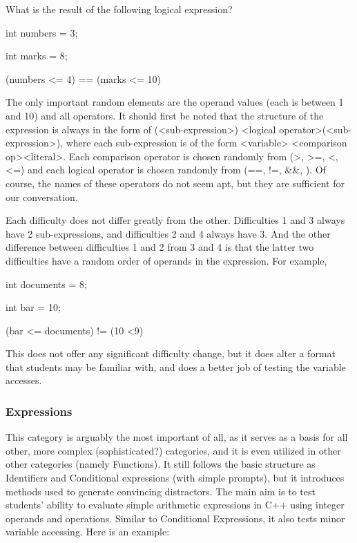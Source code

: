 \documentclass{article}
\begin{document}
\hfill \par
What is the result of the following logical expression? \par
int numbers = 3; \par
int marks = 8; \par
(numbers \textless= 4) == (marks \textless= 10) \par

\hfill \par

The only important random elements are the operand values (each is between 1 and 10) and all operators. It should first be noted that the structure of the expression
is always in the form of (\textless sub-expression\textgreater ) \textless logical operator\textgreater (\textless sub-expression\textgreater ), where each sub-expression is of the form \textless variable> \textless comparison op\textgreater \textless literal\textgreater .
Each comparison operator is chosen randomly from (\textgreater, \textgreater =, \textless , \textless =) and each logical operator is chosen randomly from (==, !=, \&\&, \textbar\textbar). Of course, the names
of these operators do not seem apt, but they are sufficient for our conversation.

Each difficulty does not differ greatly from the other. Difficulties 1 and 3 always have 2 sub-expressions, and difficulties 2 and 4 always have 3. And the other
difference between difficulties 1 and 2 from 3 and 4 is that the latter two difficulties have a random order of operands in the expression. For example,

\hfill \par
int documents = 8; \par
int bar = 10; \par
(bar \textless = documents) != (10 \textless 9) \par
\hfill \par

This does not offer any significant difficulty change, but it does alter a format that students may be familiar with, and does a better job of testing the variable accesses.


\subsubsection{Expressions}
This category is arguably the most important of all, as it serves as a basis for all other, more complex (sophisticated?) categories, and it is even utilized in other other categories
(namely Functions). It still follows the basic structure as Identifiers and Conditional expressions (with simple prompts), but it introduces methods used to generate convincing distractors.
The main aim is to test students' ability to evaluate simple arithmetic expressions in C++ using integer operands and operations. Similar to Conditional Expressions, it also
tests minor variable accessing. Here is an example:
\end{document}
